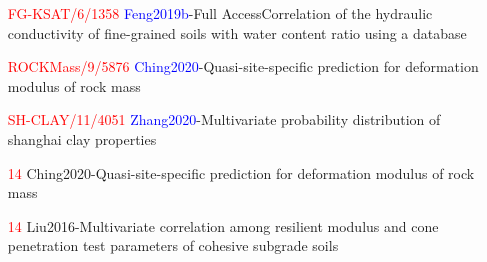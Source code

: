 \documentclass[12pt]{book}
\begin{document}
\begin{itemize}
		\item[\textcolor{red}{FG-KSAT/6/1358}] \textcolor{blue}{Feng2019b}-Full AccessCorrelation of the hydraulic conductivity of fine-grained soils with water content ratio using a database \hfill\textcolor{red}{\pageref{bib:11}}
		\item[\textcolor{red}{ROCKMass/9/5876}] \textcolor{blue}{Ching2020}-Quasi-site-specific prediction for deformation modulus of rock mass \hfill\textcolor{red}{\pageref{bib:12}}
		\item[\textcolor{red}{SH-CLAY/11/4051}] \textcolor{blue}{Zhang2020}-Multivariate probability distribution of shanghai clay properties \hfill\textcolor{red}{\pageref{bib:13}}
		\item[\textcolor{red}{14}] Ching2020-Quasi-site-specific prediction for deformation modulus of rock mass \hfill\textcolor{red}{\pageref{bib:14}}
		\item[\textcolor{red}{14}] Liu2016-Multivariate correlation among resilient modulus and cone penetration test parameters of cohesive subgrade soils \hfill\textcolor{red}{\pageref{bib:15}}
	\end{itemize}
	\cleardoublepage

	\setcounter{page}{1}
\end{document}
